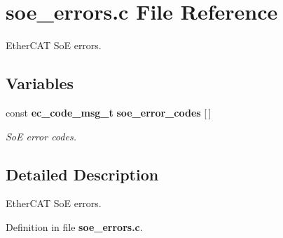 \section{soe\-\_\-errors.\-c File Reference}
\label{soe__errors_8c}


Ether\-C\-A\-T So\-E errors.  


\subsection*{Variables}
\begin{DoxyCompactItemize}
\item 
const {\bf ec\-\_\-code\-\_\-msg\-\_\-t} {\bf soe\-\_\-error\-\_\-codes} [$\,$]\label{soe__errors_8c_a4013ee44d8165e19ed7abec334d499e4}

\begin{DoxyCompactList}\small\item\em So\-E error codes. \end{DoxyCompactList}\end{DoxyCompactItemize}


\subsection{Detailed Description}
Ether\-C\-A\-T So\-E errors. 

Definition in file {\bf soe\-\_\-errors.\-c}.

